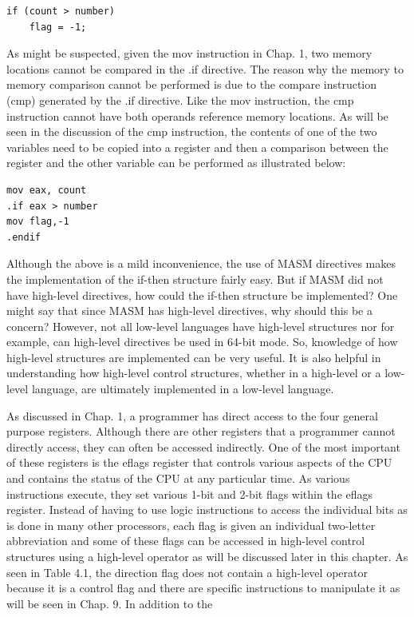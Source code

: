 \documentclass[10pt]{article}
\begin{document}
\begin{verbatim}
if (count > number)
    flag = -1;
\end{verbatim}

As might be suspected, given the mov instruction in Chap. 1, two memory locations cannot be compared in the .if directive. The reason why the memory to memory comparison cannot be performed is due to the compare instruction (cmp) generated by the .if directive. Like the mov instruction, the cmp instruction cannot have both operands reference memory locations. As will be seen in the discussion of the cmp instruction, the contents of one of the two variables need to be copied into a register and then a comparison between the register and the other variable can be performed as illustrated below:

\begin{verbatim}
mov eax, count
.if eax > number
mov flag,-1
.endif
\end{verbatim}

Although the above is a mild inconvenience, the use of MASM directives makes the implementation of the if-then structure fairly easy. But if MASM did not have high-level directives, how could the if-then structure be implemented? One might say that since MASM has high-level directives, why should this be a concern? However, not all low-level languages have high-level structures nor for example, can high-level directives be used in 64-bit mode. So, knowledge of how high-level structures are implemented can be very useful. It is also helpful in understanding how high-level control structures, whether in a high-level or a low-level language, are ultimately implemented in a low-level language.

As discussed in Chap. 1, a programmer has direct access to the four general purpose registers. Although there are other registers that a programmer cannot directly access, they can often be accessed indirectly. One of the most important of these registers is the eflags register that controls various aspects of the CPU and contains the status of the CPU at any particular time. As various instructions execute, they set various 1-bit and 2-bit flags within the eflags register. Instead of having to use logic instructions to access the individual bits as is done in many other processors, each flag is given an individual two-letter abbreviation and some of these flags can be accessed in high-level control structures using a high-level operator as will be discussed later in this chapter. As seen in Table 4.1, the direction flag does not contain a high-level operator because it is a control flag and there are specific instructions to manipulate it as will be seen in Chap. 9. In addition to the
\end{document}
